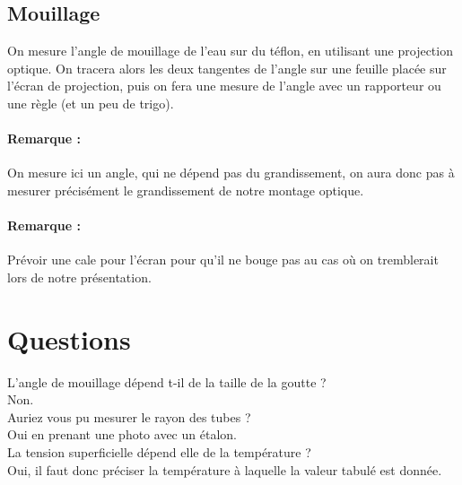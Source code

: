 \documentclass[12pt,prb,aps,epsf]{article}
\begin{document}
\subsection{Mouillage}
On mesure l'angle de mouillage de l'eau sur du téflon, en utilisant une projection optique. On tracera alors les deux tangentes de l'angle sur une feuille placée sur l'écran de projection, puis on fera une mesure de l'angle avec un rapporteur ou une règle (et un peu de trigo).

\paragraph{Remarque :} On mesure ici un angle, qui ne dépend pas du grandissement, on aura donc pas à mesurer précisément le grandissement de notre montage optique.

\paragraph{Remarque :} Prévoir une cale pour l'écran pour qu'il ne bouge pas au cas où on tremblerait lors de notre présentation.

\section*{Questions}
L'angle de mouillage dépend t-il de la taille de la goutte ?\\
Non.\\

Auriez vous pu mesurer le rayon des tubes ?\\
Oui en prenant une photo avec un étalon.\\

La tension superficielle dépend elle de la température ?\\
Oui, il faut donc préciser la température à laquelle la valeur tabulé est donnée.\\



	
\end{document}
